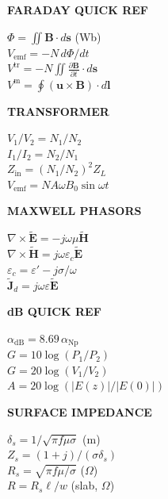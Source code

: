 \documentclass[6pt,letterpaper]{article}
\newcommand{\shead}[3]{%
  \noindent\colorbox{#1}{\parbox{\dimexpr\linewidth-2\fboxsep\relax}%
  {\color{#2}\bfseries\fontsize{6}{7}\selectfont #3}}\vspace{0.5pt}}
\begin{document}
\vfill
\noindent
\begin{minipage}[t]{0.19\linewidth}
\shead{amberbg}{amber}{FARADAY QUICK REF}
\begin{ebox}
$\Phi=\iint\mathbf{B}\cdot d\mathbf{s}$ (Wb)\\
$V_\text{emf}=-N\,d\Phi/dt$\\
$V^\text{tr}=-N\!\iint\!\tfrac{\partial\mathbf{B}}{\partial t}\!\cdot\!d\mathbf{s}$\\
$V^\text{m}=\oint(\mathbf{u}\!\times\!\mathbf{B})\!\cdot\!d\mathbf{l}$
\end{ebox}
\end{minipage}\hfill
\begin{minipage}[t]{0.19\linewidth}
\shead{tealbg}{teal}{TRANSFORMER}
\begin{ebox}
$V_1/V_2=N_1/N_2$\\
$I_1/I_2=N_2/N_1$\\
$Z_\text{in}=(N_1/N_2)^2Z_L$\\
$V_\text{emf}=NA\omega B_0\sin\omega t$
\end{ebox}
\end{minipage}\hfill
\begin{minipage}[t]{0.19\linewidth}
\shead{bluebg}{blue}{MAXWELL PHASORS}
\begin{ebox}
$\nabla\!\times\!\tilde{\mathbf{E}}=-j\omega\mu\tilde{\mathbf{H}}$\\
$\nabla\!\times\!\tilde{\mathbf{H}}=j\omega\varepsilon_c\tilde{\mathbf{E}}$\\
$\varepsilon_c=\varepsilon'-j\sigma/\omega$\\
$\tilde{\mathbf{J}}_d=j\omega\varepsilon\tilde{\mathbf{E}}$
\end{ebox}
\end{minipage}\hfill
\begin{minipage}[t]{0.19\linewidth}
\shead{graybg}{gray}{dB QUICK REF}
\begin{ebox}
$\alpha_\text{dB}=8.69\,\alpha_\text{Np}$\\
$G=10\log(P_1/P_2)$\\
$G=20\log(V_1/V_2)$\\
$A=20\log(|E(z)|/|E(0)|)$
\end{ebox}
\end{minipage}\hfill
\begin{minipage}[t]{0.19\linewidth}
\shead{coralbg}{coral}{SURFACE IMPEDANCE}
\begin{ebox}
$\delta_s=1/\sqrt{\pi f\mu\sigma}$ (m)\\
$Z_s=(1+j)/(\sigma\delta_s)$\\
$R_s=\sqrt{\pi f\mu/\sigma}$ ($\Omega$)\\
$R=R_s\ell/w$ (slab, $\Omega$)
\end{ebox}
\end{minipage}
\end{document}

